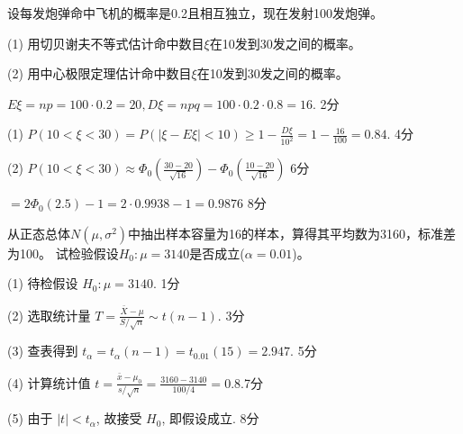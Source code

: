 \documentclass{jnuexam}
\begin{document}
\vfill


\newpage %

\begin{problem}
设每发炮弹命中飞机的概率是0.2且相互独立，现在发射100发炮弹。\par
(1) 用切贝谢夫不等式估计命中数目$\xi$在10发到30发之间的概率。\par
(2) 用中心极限定理估计命中数目$\xi$在10发到30发之间的概率。
\end{problem}

\bigskip

\begin{solution}
$E\xi = n p = 100 \cdot 0.2 = 20, D\xi = n p q = 100 \cdot 0.2 \cdot 0.8 = 16$. \dotfill 2分 \par
(1) $P (10 < \xi < 30) = P (| \xi - E \xi | < 10) \geq 1 - \frac{D\xi}{10^2}
     = 1 - \frac{16}{100} = 0.84$. \dotfill 4分 \par
(2) $P (10 < \xi < 30) \approx \Phi_0 \left( \frac{30 - 20}{\sqrt{16}}\right)
     - \Phi_0 \left( \frac{10 - 20}{\sqrt{16}} \right)$ \dotfill 6分\par
\qquad $= 2 \Phi_0 (2.5) - 1 = 2 \cdot 0.9938 - 1 =0.9876$ \dotfill 8分
\end{solution}

\vfill

\begin{problem}
从正态总体$N(\mu,\sigma^2)$中抽出样本容量为16的样本，算得其平均数为3160，标准差为100。
试检验假设$H_0:\mu=3140$是否成立($\alpha = 0.01$)。
\end{problem}

\bigskip

\begin{solution}
(1) 待检假设 $H_0 : \mu = 3140$. \dotfill 1分\par
(2) 选取统计量 $T = \frac{\bar{X}-\mu}{S / \sqrt{n}} \sim t(n-1)$. \dotfill 3分 \par
(3) 查表得到 $t_{\alpha} = t_{\alpha} (n - 1) = t_{0.01} (15) =2.947$. \dotfill 5分 \par
(4) 计算统计值 $t = \frac{\bar{x} - \mu_0}{s/\sqrt{n}} =\frac{3160-3140}{100/4} = 0.8$.\dotfill 7分 \par
(5) 由于 $| t | < t_{\alpha}$, 故接受 $H_0$, 即假设成立. \dotfill 8分
\end{solution}

\vfill

\newpagea %

\end{document}
